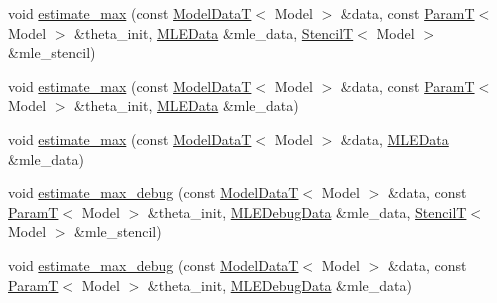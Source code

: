 \begin{DoxyCompactItemize}
\item 
void \hyperlink{classmappel_1_1estimator_1_1Estimator_a14b53d2ddc3d74a5653f71e4b5a97968}{estimate\+\_\+max} (const \hyperlink{namespacemappel_a97f050df953605381ae9c901c3b125f1}{Model\+DataT}$<$ Model $>$ \&data, const \hyperlink{namespacemappel_a667925cb0d6c0e49f2f035cc5a9a6857}{ParamT}$<$ Model $>$ \&theta\+\_\+init, \hyperlink{namespacemappel_1_1estimator_structmappel_1_1estimator_1_1MLEData}{M\+L\+E\+Data} \&mle\+\_\+data, \hyperlink{namespacemappel_a3a06598240007876f8c4bf834ad86197}{StencilT}$<$ Model $>$ \&mle\+\_\+stencil)
\item 
void \hyperlink{classmappel_1_1estimator_1_1Estimator_a8e1ea0bf9ef92871618c44a4cb770cb8}{estimate\+\_\+max} (const \hyperlink{namespacemappel_a97f050df953605381ae9c901c3b125f1}{Model\+DataT}$<$ Model $>$ \&data, const \hyperlink{namespacemappel_a667925cb0d6c0e49f2f035cc5a9a6857}{ParamT}$<$ Model $>$ \&theta\+\_\+init, \hyperlink{namespacemappel_1_1estimator_structmappel_1_1estimator_1_1MLEData}{M\+L\+E\+Data} \&mle\+\_\+data)
\item 
void \hyperlink{classmappel_1_1estimator_1_1Estimator_a8785a4f0e2d96fb4d30a533dc7541342}{estimate\+\_\+max} (const \hyperlink{namespacemappel_a97f050df953605381ae9c901c3b125f1}{Model\+DataT}$<$ Model $>$ \&data, \hyperlink{namespacemappel_1_1estimator_structmappel_1_1estimator_1_1MLEData}{M\+L\+E\+Data} \&mle\+\_\+data)
\item 
void \hyperlink{classmappel_1_1estimator_1_1Estimator_aca8f7fcc8d2754f55092e1dc33cff8a9}{estimate\+\_\+max\+\_\+debug} (const \hyperlink{namespacemappel_a97f050df953605381ae9c901c3b125f1}{Model\+DataT}$<$ Model $>$ \&data, const \hyperlink{namespacemappel_a667925cb0d6c0e49f2f035cc5a9a6857}{ParamT}$<$ Model $>$ \&theta\+\_\+init, \hyperlink{namespacemappel_1_1estimator_structmappel_1_1estimator_1_1MLEDebugData}{M\+L\+E\+Debug\+Data} \&mle\+\_\+data, \hyperlink{namespacemappel_a3a06598240007876f8c4bf834ad86197}{StencilT}$<$ Model $>$ \&mle\+\_\+stencil)
\item 
void \hyperlink{classmappel_1_1estimator_1_1Estimator_a2cb11ee4a6b01c38064b03d761840838}{estimate\+\_\+max\+\_\+debug} (const \hyperlink{namespacemappel_a97f050df953605381ae9c901c3b125f1}{Model\+DataT}$<$ Model $>$ \&data, const \hyperlink{namespacemappel_a667925cb0d6c0e49f2f035cc5a9a6857}{ParamT}$<$ Model $>$ \&theta\+\_\+init, \hyperlink{namespacemappel_1_1estimator_structmappel_1_1estimator_1_1MLEDebugData}{M\+L\+E\+Debug\+Data} \&mle\+\_\+data)

\end{DoxyCompactItemize}
